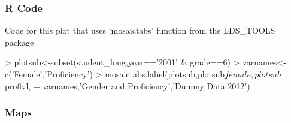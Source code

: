 \documentclass[12pt,handout]{beamer}
\begin{document}
\begin{frame}[containsverbatim]
\frametitle{R Code}
Code for this plot that uses `mosaictabs' function from the LDS\_TOOLS package
\vspace{.1in}
\begin{Schunk}
\begin{Sinput}
> plotsub<-subset(student_long,year=='2001' & grade==6)
> varnames<-c('Female','Proficiency')
> mosaictabs.label(plotsub,plotsub$female,plotsub$proflvl,
+                 varnames,'Gender and Proficiency','Dummy Data 2012')
\end{Sinput}
\end{Schunk}
\end{frame}


\begin{frame}
\frametitle{Maps}
\begin{center}
\end{center}
\end{frame}
\end{document}
